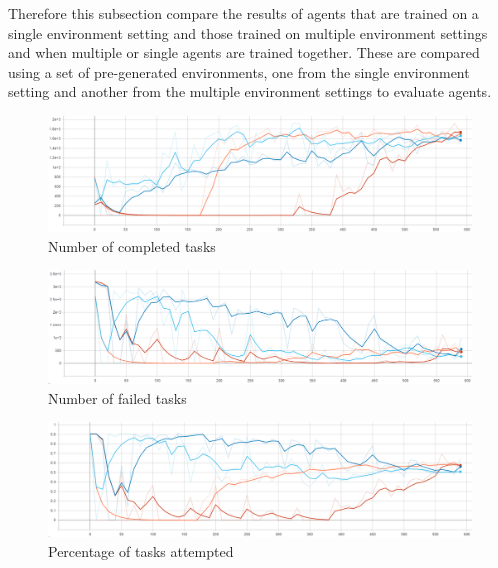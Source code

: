 Therefore this subsection compare the results of agents that are trained on a single environment setting and those
trained on multiple environment settings and when multiple or single agents are trained together. These are compared
using a set of pre-generated environments, one from the single environment setting and another from the multiple
environment settings to evaluate agents.

\begin{figure}[H]
    \centering
    \includegraphics[width=\linewidth]{figures/5_evaluation_figs/env_training_fig/num_completed_tasks.png}
    \caption{Number of completed tasks}
    \label{fig:env_num_completed_tasks}
\end{figure}

\begin{figure}[H]
    \centering
    \includegraphics[width=\linewidth]{figures/5_evaluation_figs/env_training_fig/num_failed_tasks.png}
    \caption{Number of failed tasks}
    \label{fig:env_num_failed_tasks}
\end{figure}

\begin{figure}[H]
    \centering
    \includegraphics[width=\linewidth]{figures/5_evaluation_figs/env_training_fig/percent_tasks.png}
    \caption{Percentage of tasks attempted}
    \label{fig:env_percent_tasks}
\end{figure}

